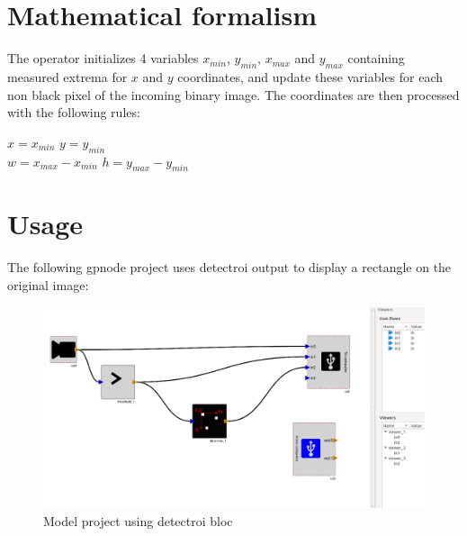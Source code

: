 \documentclass[12pt,a4paper]{article}
\begin{document}
\newpage
\section*{Mathematical formalism}

The operator initializes 4 variables $x_{min}$, $y_{min}$, $x_{max}$ and $y_{max}$ containing measured extrema for $x$ and $y$ coordinates, and update these variables for each non black pixel of the incoming binary image. The coordinates are then processed with the following rules:

\centering
$x = x_{min}$ \hspace*{2cm} $y = y_{min}$\\
$w = x_{max} - x_{min}$ \hspace*{2cm} $h = y_{max} - y_{min}$\\

\section*{Usage}
The following gpnode project uses detectroi output to display a rectangle on the original image:
\begin{figure}[h!]
\centering
\label{detectROIusage}
\caption{Model project using detectroi bloc}
\includegraphics[width=14cm]{detectroiUsage.png}
\end{figure}
\end{document}
